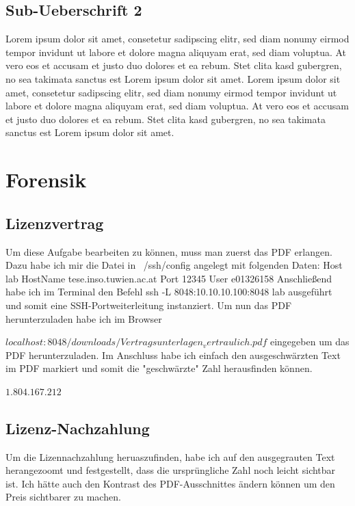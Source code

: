 \documentclass[12pt,a4paper,titlepage,oneside]{scrartcl}
\begin{document}
\subsection{Sub-Ueberschrift 2}
Lorem ipsum dolor sit amet, consetetur sadipscing elitr, sed diam nonumy eirmod tempor invidunt ut labore et dolore magna aliquyam erat, sed diam voluptua. At vero eos et accusam et justo duo dolores et ea rebum. Stet clita kasd gubergren, no sea takimata sanctus est Lorem ipsum dolor sit amet. Lorem ipsum dolor sit amet, consetetur sadipscing elitr, sed diam nonumy eirmod tempor invidunt ut labore et dolore magna aliquyam erat, sed diam voluptua. At vero eos et accusam et justo duo dolores et ea rebum. Stet clita kasd gubergren, no sea takimata sanctus est Lorem ipsum dolor sit amet.

\section{Forensik}

\subsection{Lizenzvertrag}
Um diese Aufgabe bearbeiten zu können, muss man zuerst das PDF erlangen.
Dazu habe ich mir die Datei in ~/ssh/config angelegt mit folgenden Daten:
\newline
\newline
Host lab \newline
HostName tese.inso.tuwien.ac.at \newline
Port 12345 \newline
User e01326158
\newline
\newline
Anschließend habe ich im Terminal den Befehl ssh -L 8048:10.10.10.100:8048 lab ausgeführt und somit eine SSH-Portweiterleitung instanziert.
Um nun das PDF herunterzuladen habe ich im Browser

$localhost:8048/downloads/Vertragsunterlagen_vertraulich.pdf$
\newline
\newline
eingegeben um das PDF herunterzuladen. Im Anschluss habe ich einfach den ausgeschwärzten Text im PDF markiert und somit die "geschwärzte" Zahl herausfinden können.

$1.804.167.212$


\subsection{Lizenz-Nachzahlung}
Um die Lizennachzahlung heruaszufinden, habe ich auf den ausgegrauten Text herangezoomt und festgestellt, dass die ursprüngliche Zahl noch leicht sichtbar ist. Ich hätte auch den Kontrast des PDF-Ausschnittes ändern können um den Preis sichtbarer zu machen.
\end{document}

